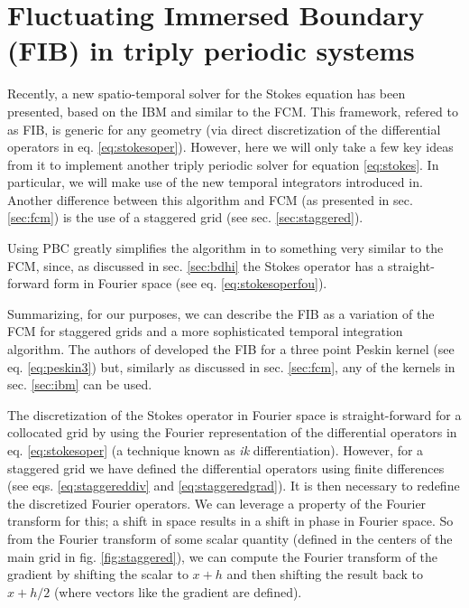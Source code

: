 \documentclass[ twoside,openright,titlepage,numbers=noenddot,%
headinclude,footinclude,cleardoublepage=empty,abstract=on,
BCOR=5mm,paper=a4,fontsize=11pt, dvipsnames
]{scrreprt}
\begin{document}
\section{Fluctuating Immersed Boundary (FIB) in triply periodic systems}
Recently, a new spatio-temporal solver for the Stokes equation has been presented, based on the \gls{IBM} and similar to the \gls{FCM}\cite{Delong2014}. This framework, refered to as \gls{FIB}, is generic for any geometry (via direct discretization of the differential operators in eq. \eqref{eq:stokesoper}). However, here we will only take a few key ideas from it to implement another triply periodic solver for equation \eqref{eq:stokes}. In particular, we will make use of the new temporal integrators introduced in\cite{Delong2014}. Another difference between this algorithm and \gls{FCM} (as presented in sec. \ref{sec:fcm}) is the use of a staggered grid (see sec. \ref{sec:staggered}).

Using \gls{PBC} greatly simplifies the algorithm in \cite{Delong2014} to something very similar to the \gls{FCM}, since, as discussed in sec. \ref{sec:bdhi} the Stokes operator has a straight-forward form in Fourier space (see eq. \eqref{eq:stokesoperfou}).

Summarizing, for our purposes, we can describe the \gls{FIB} as a variation of the \gls{FCM} for staggered grids and a more sophisticated temporal integration algorithm. The authors of \cite{Delong2013} developed the \gls{FIB} for a three point Peskin kernel (see eq. \eqref{eq:peskin3}) but, similarly as discussed in sec. \ref{sec:fcm}, any of the kernels in sec. \ref{sec:ibm} can be used.

The discretization of the Stokes operator in Fourier space is straight-forward for a collocated grid by using the Fourier representation of the differential operators in eq. \eqref{eq:stokesoper} (a technique known as \emph{ik} differentiation). However, for a staggered grid we have defined the differential operators using finite differences (see eqs. \eqref{eq:staggereddiv} and \eqref{eq:staggeredgrad}). It is then necessary to redefine the discretized Fourier operators. We can leverage a property of the Fourier transform for this; a shift in space results in a shift in phase in Fourier space. So from the Fourier transform of some scalar quantity (defined in the centers of the main grid in fig. \ref{fig:staggered}), we can compute the Fourier transform of the gradient by shifting the scalar to $x+h$ and then shifting the result back to $x+h/2$ (where vectors like the gradient are defined).
\end{document}
